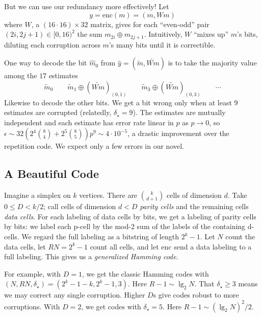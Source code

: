 \documentclass[12pt]{article}
\newcommand{\msec}[1]{\subsection*{\color{mblu}\textsf{#1}}}
\newcommand{\mpar}[1]{%
    \makebox[0cm]{\hspace{-4.75cm}\parbox{2.5cm}{\raggedleft\color{mblulite}\textsf{#1}}}%
}
\theoremstyle{definition}
\newcommand{\enc}{\text{enc}}
\begin{document}
    \mpar{pairwise}%
    But we can use our redundancy more effectively!  Let
    $$
        y=\enc(m)=(m,Wm)
    $$
    where $W$, a $(16\cdot 16)\times 32$ matrix, gives for each ``even-odd''
    pair $(2i,2j+1) \in [0,16)^2$ the sum $m_{2i}\oplus m_{2j+1}$.  Intuitively, $W$
    ``mixes up'' $m$'s bits, diluting each corruption across $m$'s many bits
    until it is correctible.

    One way to decode the bit $\hat m_0$ from $\hat y = (\tilde m,
    \tilde{Wm})$ is to take the majority value among the $17$ estimates
    $$
        \tilde m_0
        \quad
        \quad
        \tilde m_1\oplus (\widetilde{Wm})_{(0,1)}
        \quad
        \quad
        \tilde m_3\oplus (\widetilde{Wm})_{(0,3)}
        \quad
        \quad
        \cdots
    $$
    Likewise to decode the other bits.
    We get a bit wrong only when at least $9$ estimates are corrupted
    (relatedly, $\delta_\star=9$).  The estimates are mutually independent and
    each estimate has error rate linear in $p$ as $p\to 0$, so $\epsilon \sim
    32\left(2^4{8\choose 4} + 2^5{8\choose 5}\right) p^9 \sim 4 \cdot 10^{-5}$, a
    drastic improvement over the repetition code.  We expect only a few errors
    in our novel.


\msec{A Beautiful Code}

    \indent\par
    \mpar{hamming}
    Imagine a simplex on $k$ vertices.  There are ${k \choose d+1}$ cells
    of dimension $d$.  Take $0\leq D<k/2$; call cells of dimension $d<D$
    \emph{parity cells} and the remaining cells \emph{data cells}.
    For each labeling of data cells by bits, we get a labeling of parity cells
    by bits: we label each p-cell by the mod-2 sum of the labels of the
    containing d-cells.
    We regard the full labeling as a bitstring of
    length $2^k-1$.  Let $N$ count the data cells, let $RN = 2^k-1$ count all
    cells, and let $\enc$ send a data labeling to a full labeling.  This
    gives us a \emph{generalized Hamming code}.

    For example, with $D=1$, we get the classic Hamming codes with
    $(N,RN,\delta_\star) = (2^k-1-k,2^k-1,3)$.  Here $R-1 \sim \lg_2 N$. 
    That $\delta_\star\geq 3$ means we may correct any single corruption.
    Higher $D$s give codes robust to more corruptions.
    With $D=2$, we get codes with $\delta_\star=5$.  Here $R-1 \sim (\lg_2 N)^2/2$.
\end{document}
